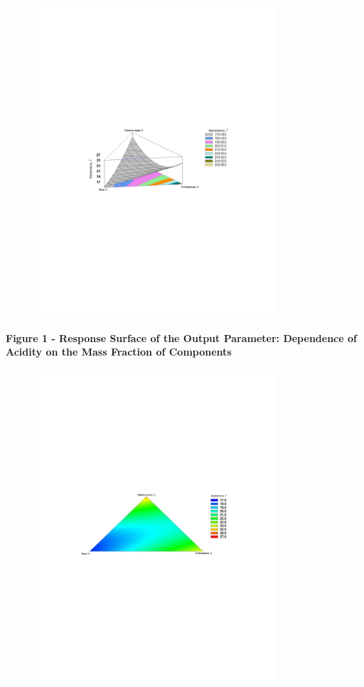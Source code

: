 \begin{figure}[H]
	\centering
	\includegraphics[width=0.8\textwidth]{media/pish/image5}
	\caption*{}
\end{figure}


{\bfseries Figure 1 - Response Surface of the Output Parameter: Dependence
of Acidity on the Mass Fraction of Components}

\begin{figure}[H]
	\centering
	\includegraphics[width=0.8\textwidth]{media/pish/image6}
	\caption*{}
\end{figure}


